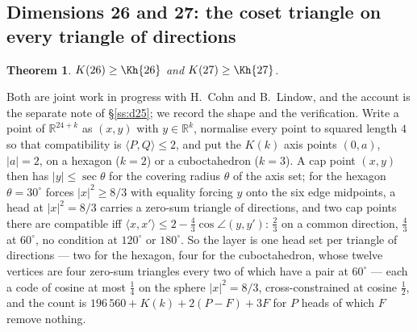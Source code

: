 \documentclass[11pt]{amsart}
\newtheorem{theorem}{Theorem}[section]
\theoremstyle{remark}
\newcommand{\ip}[2]{\langle #1,#2\rangle}
\newcommand{\R}{\mathbb{R}}
\begin{document}
\subsection{Dimensions 26 and 27: the coset triangle on every triangle of
directions}\label{ss:d2627}

\begin{theorem}\label{thm:2627}
$K(26)\ge\Kh{26}$ and $K(27)\ge\Kh{27}$.
\end{theorem}

Both are joint work in progress with H.~Cohn and B.~Lindow, and the account is
the separate note of \S\ref{ss:d25}; we record the shape and the verification.
Write a point of $\R^{24+k}$ as $(x,y)$ with $y\in\R^{k}$, normalise every point
to squared length $4$ so that compatibility is $\ip{P}{Q}\le2$, and put the
$K(k)$ axis points $(0,a)$, $|a|=2$, on a hexagon ($k=2$) or a cuboctahedron
($k=3$). A cap point $(x,y)$ then has $|y|\le\sec\theta$ for the covering radius
$\theta$ of the axis set; for the hexagon $\theta=30^{\circ}$ forces $|x|^{2}\ge8/3$
with equality forcing $y$ onto the six edge midpoints, a head at $|x|^{2}=8/3$
carries a zero-sum triangle of directions, and two cap points there are
compatible iff $\ip{x}{x'}\le2-\tfrac43\cos\angle(y,y')$: $\tfrac23$ on a common
direction, $\tfrac43$ at $60^{\circ}$, no condition at $120^{\circ}$ or $180^{\circ}$.
So the layer is one head set per triangle of directions --- two for the hexagon,
four for the cuboctahedron, whose twelve vertices are four zero-sum triangles
every two of which have a pair at $60^{\circ}$ --- each a code of cosine at most
$\tfrac14$ on the sphere $|x|^{2}=8/3$, cross-constrained at cosine $\tfrac12$, and
the count is $196\,560+K(k)+2(P-F)+3F$ for $P$ heads of which $F$ remove nothing.
\end{document}
